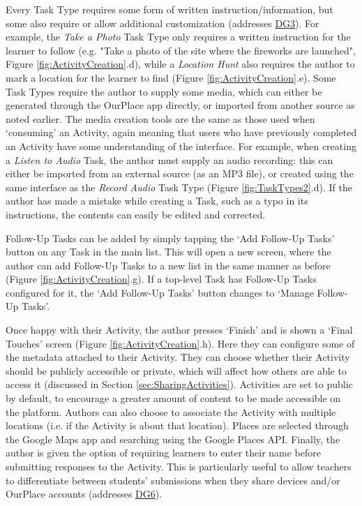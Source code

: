 Every Task Type requires some form of written instruction/information, but some also require or allow additional customization (addresses \hyperref[DG3]{DG3}). For example, the \textit{Take a Photo} Task Type only requires a written instruction for the learner to follow (e.g. "Take a photo of the site where the fireworks are launched", Figure \ref{fig:ActivityCreation}.d), while a \textit{Location Hunt} also requires the author to mark a location for the learner to find (Figure \ref{fig:ActivityCreation}.e). Some Task Types require the author to supply some media, which can either be generated through the OurPlace app directly, or imported from another source as noted earlier. The media creation tools are the same as those used when `consuming' an Activity, again meaning that users who have previously completed an Activity have some understanding of the interface. For example, when creating a \textit{Listen to Audio} Task, the author must supply an audio recording: this can either be imported from an external source (as an MP3 file), or created using the same interface as the \textit{Record Audio} Task Type (Figure \ref{fig:TaskTypes2}.d). If the author has made a mistake while creating a Task, such as a typo in its instructions, the contents can easily be edited and corrected.

Follow-Up Tasks can be added by simply tapping the `Add Follow-Up Tasks' button on any Task in the main list. This will open a new screen, where the author can add Follow-Up Tasks to a new list in the same manner as before (Figure \ref{fig:ActivityCreation}.g). If a top-level Task has Follow-Up Tasks configured for it, the `Add Follow-Up Tasks' button changes to `Manage Follow-Up Tasks'.

Once happy with their Activity, the author presses `Finish' and is shown a `Final Touches' screen (Figure \ref{fig:ActivityCreation}.h). Here they can configure some of the metadata attached to their Activity. They can choose whether their Activity should be publicly accessible or private, which will affect how others are able to access it (discussed in Section \ref{sec:SharingActivities}). Activities are set to public by default, to encourage a greater amount of content to be made accessible on the platform. Authors can also choose to associate the Activity with multiple locations (i.e. if the Activity is about that location). Places are selected through the Google Maps app and searching using the Google Places API. Finally, the author is given the option of requiring learners to enter their name before submitting responses to the Activity. This is particularly useful to allow teachers to differentiate between students' submissions when they share devices and/or OurPlace accounts (addresses \hyperref[DG6]{DG6}).

